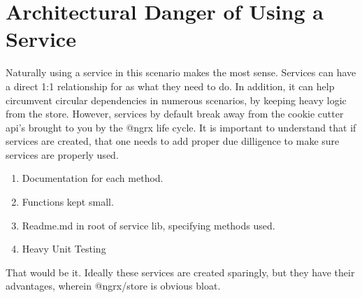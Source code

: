 \section{Architectural Danger of Using a Service}
Naturally using a service in this scenario makes the most sense. Services can
have a direct 1:1 relationship for as what they need to do. In addition, it can
help circumvent circular dependencies in numerous scenarios, by keeping heavy
logic from the store. However, services by default break away from the cookie
cutter api's brought to you by the @ngrx life cycle. It is important to
understand that if services are created, that one needs to add proper due
dilligence to make sure services are properly used.
\begin{enumerate}
  \item Documentation for each method.
  \item Functions kept small.
  \item Readme.md in root of service lib, specifying methods used.
  \item Heavy Unit Testing
\end{enumerate}

That would be it. Ideally these services are created sparingly, but they have
their advantages, wherein @ngrx/store is obvious bloat.

